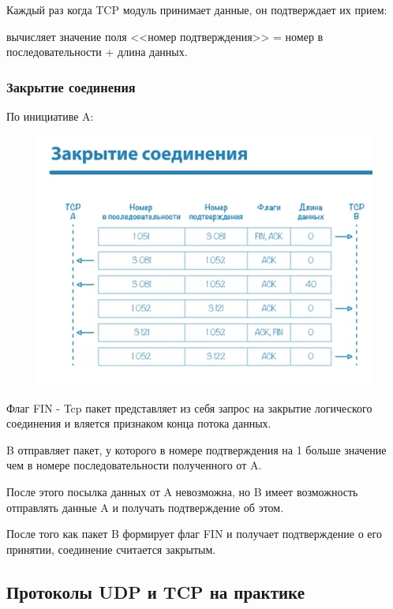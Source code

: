 \documentclass[a4paper,12pt]{article}
\begin{document}
	Каждый раз когда TCP модуль принимает данные, он подтверждает их прием:
	
	вычисляет значение поля <<номер подтверждения>> = номер в последовательности + длина данных.
	
	
	\subsubsection{Закрытие соединения}
	
	По инициативе A:
	
	\begin{figure}[h!]
		\begin{center}
			{\includegraphics[scale = 1]{9.png}}
			\label{9}
		\end{center}
	\end{figure}

	Флаг FIN - Tcp пакет представляет из себя запрос на закрытие логического соединения и вляется признаком конца потока данных.
	
	B отправляет пакет, у которого в номере подтверждения на 1 больше значение чем в номере последовательности полученного от A.
	
	После этого посылка данных от A невозможна, но B имеет возможность отправлять данные A и получать подтверждение об этом.
	
	После того как пакет B формирует флаг FIN и получает подтверждение о его принятии, соединение считается закрытым.
	
	\subsection{Протоколы UDP и TCP на практике}
	
\end{document}
